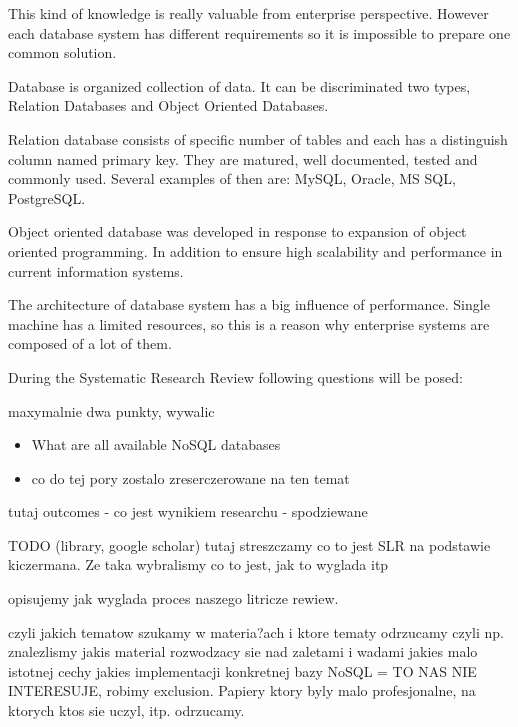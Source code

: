 \documentclass[times, 10pt,twocolumn]{article}
\begin{document}
This kind of knowledge is really valuable from enterprise perspective. However each database
system has different requirements so it is impossible to prepare one common solution.
 

Database is organized collection of data. It can be discriminated two types, 
Relation Databases and Object Oriented Databases.

Relation database consists of specific number of tables and each has a distinguish column named primary key. 
They are matured, well documented, tested and commonly used. Several examples of then are: MySQL, Oracle, MS SQL, PostgreSQL. 

Object oriented database was developed in response to expansion of object oriented programming. In addition to ensure high scalability and  
performance in current information systems.

The architecture of database system has a big influence of performance. Single machine has a limited
resources, so this is a reason why enterprise systems  are composed of a lot of them.



During the Systematic Research Review following questions will be posed: 

maxymalnie dwa punkty, wywalic

\begin{itemize}
  \item What are all available NoSQL databases
  \item co do tej pory zostalo zreserczerowane na ten temat 
\end{itemize}

tutaj outcomes - co jest wynikiem researchu - spodziewane


TODO (library, google scholar)
tutaj streszczamy co to jest SLR na podstawie kiczermana. Ze taka wybralismy
co to jest, jak to wyglada itp


opisujemy jak wyglada proces naszego litricze rewiew.


czyli jakich tematow szukamy w materia?ach
i ktore tematy odrzucamy
czyli np. znalezlismy jakis material rozwodzacy sie nad zaletami i wadami jakies malo istotnej cechy jakies implementacji konkretnej bazy NoSQL = TO NAS NIE INTERESUJE, robimy exclusion. 
Papiery ktory byly malo profesjonalne, na ktorych ktos sie uczyl, itp. odrzucamy.
\end{document}
